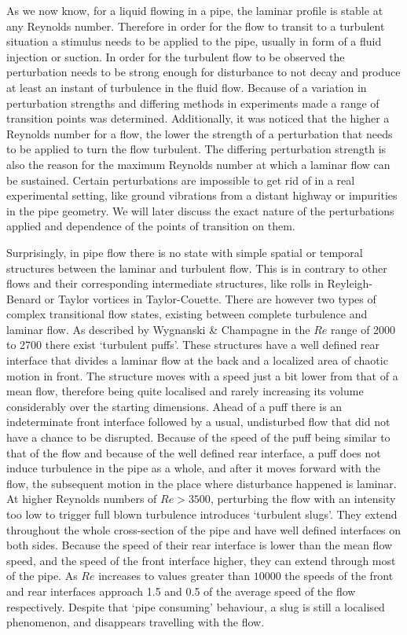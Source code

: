 \documentclass[11pt,a4paper]{article}
\begin{document}
As we now know, for a liquid flowing in a pipe, the laminar profile is stable at any Reynolds number\cite{Eckhardt07}.
Therefore in order for the flow to transit to a turbulent situation a stimulus needs to be applied to the pipe, usually in form of a fluid injection or suction\cite{Darbyshire95}.
In order for the turbulent flow to be observed the perturbation needs to be strong enough for disturbance to not decay and produce at least an instant of turbulence in the fluid flow\cite{Salwen80}\cite{Meseguer03}.
Because of a variation in perturbation strengths and differing methods in experiments made a range of transition points was determined.
Additionally, it was noticed that the higher a Reynolds number for a flow, the lower the strength of a perturbation that needs to be applied to turn the flow turbulent\cite{Hof03}.
The differing perturbation strength is also the reason for the maximum Reynolds number at which a laminar flow can be sustained.
Certain perturbations are impossible to get rid of in a real experimental setting, like ground vibrations from a distant highway or impurities in the pipe geometry.
We will later discuss the exact nature of the perturbations applied and dependence of the points of transition on them.

Surprisingly, in pipe flow there is no state with simple spatial or temporal structures between the laminar and turbulent flow\cite{Eckhardt07}.
This is in contrary to other flows and their corresponding intermediate structures, like rolls in Reyleigh-Benard or Taylor vortices in Taylor-Couette.
There are however two types of complex transitional flow states, existing between complete turbulence and laminar flow.
As described by Wygnanski \& Champagne\cite{Wygnanski73} in the \(Re\) range of 2000 to 2700 there exist `turbulent puffs'.
These structures have a well defined rear interface that divides a laminar flow at the back and a localized area of chaotic motion in front.
The structure moves with a speed just a bit lower from that of a mean flow, therefore being quite localised and rarely increasing its volume considerably over the starting dimensions.
Ahead of a puff there is an indeterminate front interface followed by a usual, undisturbed flow that did not have a chance to be disrupted.
Because of the speed of the puff being similar to that of the flow and because of the well defined rear interface, a puff does not induce turbulence in the pipe as a whole, and after it moves forward with the flow, the subsequent motion in the place where disturbance happened is laminar.
At higher Reynolds numbers of \(Re > 3500\), perturbing the flow with an intensity too low to trigger full blown turbulence introduces `turbulent slugs'.
They extend throughout the whole cross-section of the pipe and have well defined interfaces on both sides.
Because the speed of their rear interface is lower than the mean flow speed, and the speed of the front interface higher, they can extend through most of the pipe.
As \(Re\) increases to values greater than \(10000\) the speeds of the front and rear interfaces approach 1.5 and 0.5 of the average speed of the flow respectively.
Despite that `pipe consuming' behaviour, a slug is still a localised phenomenon, and disappears travelling with the flow.
\end{document}
